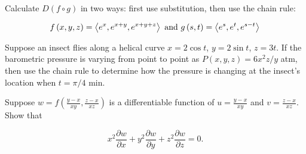 \documentclass[12pt,letterpaper]{hmcpset}
\newcommand{\pn}[1]{\left( #1 \right)}
\newcommand{\vc}[1]{\left\langle #1 \right\rangle}
\newcommand{\pder}[2]{\frac{\partial #1}{\partial #2}}
\begin{document}
\begin{solution}
\end{solution}

\begin{problem}[3.c]

    Calculate $D\pn{f \circ g}$ in two ways: first use substitution, then use the chain rule:

    \[
        f\pn{x,y,z} = \vc{e^x, e^{x+y}, e^{x+y+z}} \text{ and } g\pn{s,t} = \vc{e^s, e^t, e^{s-t}}\\
    \]

\end{problem}

\begin{solution}
\end{solution}

\begin{problem}[4]

    Suppose an insect flies along a helical curve $x = 2 \cos t$, $y = 2 \sin t$, $z = 3t$. If the barometric pressure is varying from point to point as $P\pn{x, y, z} = 6x^2z/y$ atm, then use the chain rule to determine how the pressure is changing at the insect’s location when $t = \pi /4$ min.

\end{problem}

\begin{solution}
\end{solution}

\begin{problem}[5]

    Suppose $w = f\pn{\frac{y - x}{xy}, \frac{z - x}{xz}}$ is a differentiable function of $u=\frac{y - x}{xy}$ and $v = \frac{z - x}{xz}$. Show that

    \[
        x^2 \pder{w}{x} + y^2 \pder{w}{y} + z^2 \pder{w}{z} = 0.
    \]

\end{problem}

\begin{solution}
\end{solution}
\end{document}
